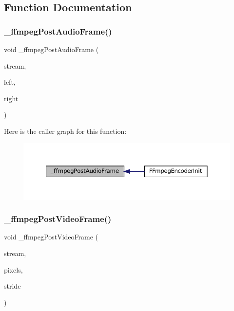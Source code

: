 \subsection{Function Documentation}
\mbox{\label{ffmpeg-encoder_8c_a90db63fa012864b15e512de2e3699bb5}} 
\subsubsection{\texorpdfstring{\+\_\+ffmpeg\+Post\+Audio\+Frame()}{\_ffmpegPostAudioFrame()}}
{\footnotesize\ttfamily void \+\_\+ffmpeg\+Post\+Audio\+Frame (\begin{DoxyParamCaption}\item[{struct m\+A\+V\+Stream $\ast$}]{stream,  }\item[{int16\+\_\+t}]{left,  }\item[{int16\+\_\+t}]{right }\end{DoxyParamCaption})\hspace{0.3cm}{\ttfamily [static]}}

Here is the caller graph for this function\+:
\nopagebreak
\begin{figure}[H]
\begin{center}
\leavevmode
\includegraphics[width=350pt]{ffmpeg-encoder_8c_a90db63fa012864b15e512de2e3699bb5_icgraph}
\end{center}
\end{figure}
\mbox{\label{ffmpeg-encoder_8c_a991130b3e2d7c60555b6daa8e2e14511}} 
\subsubsection{\texorpdfstring{\+\_\+ffmpeg\+Post\+Video\+Frame()}{\_ffmpegPostVideoFrame()}}
{\footnotesize\ttfamily void \+\_\+ffmpeg\+Post\+Video\+Frame (\begin{DoxyParamCaption}\item[{struct m\+A\+V\+Stream $\ast$}]{stream,  }\item[{const color\+\_\+t $\ast$}]{pixels,  }\item[{size\+\_\+t}]{stride }\end{DoxyParamCaption})\hspace{0.3cm}{\ttfamily [static]}}

